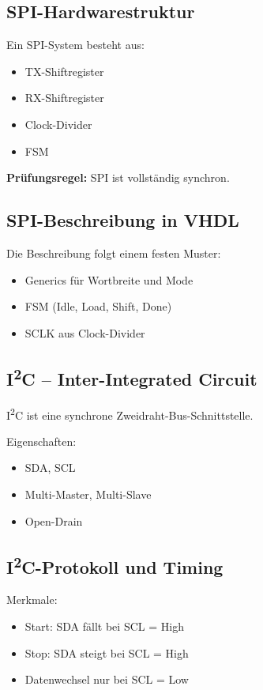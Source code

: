 \documentclass[11pt,a4paper]{article}
\newcommand{\hilite}[1]{\colorbox{yellow!25}{#1}}
\newcommand{\imp}[1]{\textbf{\textcolor{codeemph}{#1}}}
\begin{document}
\subsection{SPI-Hardwarestruktur}
Ein SPI-System besteht aus:
\begin{itemize}
  \item TX-Shiftregister
  \item RX-Shiftregister
  \item Clock-Divider
  \item FSM
\end{itemize}

\imp{Prüfungsregel:}  
\hilite{SPI} ist \hilite{vollständig} \hilite{synchron}.

\subsection{SPI-Beschreibung in VHDL}
Die Beschreibung folgt einem festen Muster:
\begin{itemize}
  \item Generics für Wortbreite und Mode
  \item FSM (Idle, Load, Shift, Done)
  \item SCLK aus Clock-Divider
\end{itemize}

\subsection{I\textsuperscript{2}C – Inter-Integrated Circuit}
I\textsuperscript{2}C ist eine synchrone Zweidraht-Bus-Schnittstelle.

Eigenschaften:
\begin{itemize}
  \item SDA, SCL
  \item Multi-Master, Multi-Slave
  \item Open-Drain
\end{itemize}

\subsection{I\textsuperscript{2}C-Protokoll und Timing}
Merkmale:
\begin{itemize}
  \item Start: SDA fällt bei SCL = High
  \item Stop: SDA steigt bei SCL = High
  \item Datenwechsel nur bei SCL = Low
\end{itemize}
\end{document}
